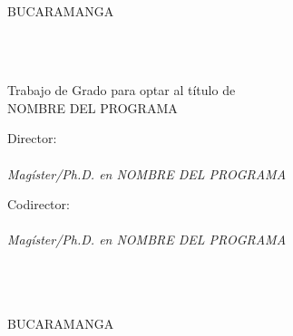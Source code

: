 
\thispagestyle{empty}

\begin{center}

\MakeUppercase{\titulo} \vspace{7cm}

\MakeUppercase{\autor}\\
\vspace{7cm}

\MakeUppercase{\universidad}\\
\MakeUppercase{\facultad}\\
\MakeUppercase{\escuela}\\
BUCARAMANGA\\
\fecha\\

\end{center}


\newpage
\thispagestyle{empty}

\begin{center}

\MakeUppercase{\titulo} \vspace{2.3cm}

\MakeUppercase{\autor}\\
\vspace{2.3cm}

Trabajo de Grado para optar al título de\\
NOMBRE DEL PROGRAMA\\\vspace{1.5cm}

Director:\\
\director\\
\textit{Magíster/Ph.D. en NOMBRE DEL PROGRAMA}\vspace{0.5cm}

Codirector:\\
\codirector\\
\textit{Magíster/Ph.D. en NOMBRE DEL PROGRAMA} \vspace{1.5cm}

\MakeUppercase{\universidad}\\
\MakeUppercase{\facultad}\\
\MakeUppercase{\escuela}\\
BUCARAMANGA\\
\fecha\\

\end{center}

